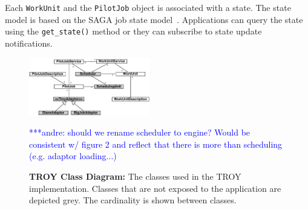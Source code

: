 \documentclass[conference,final]{IEEEtran}
\newcommand{\alnote}[1]{ {\textcolor{blue} { ***andre: #1 }}}
\newcommand{\alnote}[1]{}
\begin{document}


Each \texttt{WorkUnit} and the \texttt{PilotJob} object is associated with a
state. The state model is based on the SAGA job state model~\cite{saga_gfd90}.
Applications can query the state using the \texttt{get\_state()} method or they
can subscribe to state update notifications.

\begin{figure}[t]
	\centering
		\includegraphics[width=0.47\textwidth]{figures/troy_classes.pdf}
                \caption{\textbf{TROY Class Diagram:} The classes used
                  in the TROY implementation. Classes that are not
                  exposed to the application are depicted grey. The
                  cardinality is shown between classes.  }
		\alnote{should we rename scheduler to engine? Would be
                  consistent w/ figure 2 and reflect that there is
                  more than scheduling (e.g. adaptor loading...)}
	\label{fig:figures_troy_classes}
\end{figure}
\end{document}

